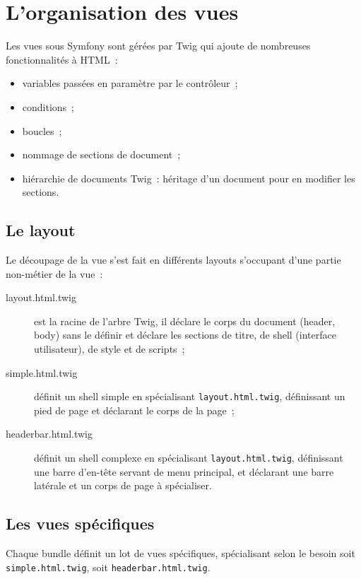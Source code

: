 \section{L'organisation des vues}

Les vues sous Symfony sont gérées par Twig qui ajoute de nombreuses fonctionnalités à HTML~:
\begin{itemize}
    \item variables passées en paramètre par le contrôleur~;
    \item conditions~;
    \item boucles~;
    \item nommage de sections de document~;
    \item hiérarchie de documents Twig~: héritage d'un document pour en modifier les sections.
\end{itemize}

\subsection{Le layout}

Le découpage de la vue s'est fait en différents layouts s'occupant d'une partie non-métier de la vue~:
\begin{description}
    \item [layout.html.twig] est la racine de l'arbre Twig, il déclare le corps du document (header, body) sans le définir et déclare les sections de titre, de shell (interface utilisateur), de style et de scripts~;
    \item [simple.html.twig] définit un shell simple en spécialisant \verb|layout.html.twig|, définissant un pied de page et déclarant le corps de la page~;
    \item [headerbar.html.twig]  définit un shell complexe en spécialisant \verb|layout.html.twig|, définissant une barre d'en-tête servant de menu principal, et déclarant une barre latérale et un corps de page à spécialiser.
\end{description}

\subsection{Les vues spécifiques}

Chaque bundle définit un lot de vues spécifiques, spécialisant selon le besoin soit \verb|simple.html.twig|, soit \verb|headerbar.html.twig|.

